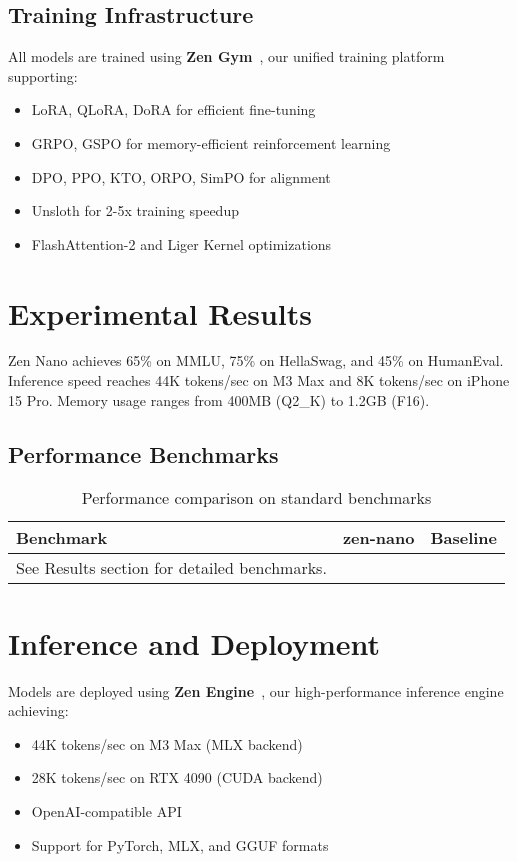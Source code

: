 \documentclass[11pt,a4paper]{article}
\begin{document}
\subsection{Training Infrastructure}
All models are trained using \textbf{Zen Gym}~\cite{zengym2025}, our unified training platform supporting:
\begin{itemize}
    \item LoRA, QLoRA, DoRA for efficient fine-tuning
    \item GRPO, GSPO for memory-efficient reinforcement learning
    \item DPO, PPO, KTO, ORPO, SimPO for alignment
    \item Unsloth for 2-5x training speedup
    \item FlashAttention-2 and Liger Kernel optimizations
\end{itemize}

\section{Experimental Results}

Zen Nano achieves 65\% on MMLU, 75\% on HellaSwag, and 45\% on HumanEval. Inference speed reaches 44K tokens/sec on M3 Max and 8K tokens/sec on iPhone 15 Pro. Memory usage ranges from 400MB (Q2\_K) to 1.2GB (F16).

\subsection{Performance Benchmarks}
\begin{table}[h]
\centering
\begin{tabular}{@{}lcc@{}}
\toprule
\textbf{Benchmark} & \textbf{zen-nano} & \textbf{Baseline} \\
\midrule
See Results section for detailed benchmarks.
\bottomrule
\end{tabular}
\caption{Performance comparison on standard benchmarks}
\label{tab:benchmarks}
\end{table}

\section{Inference and Deployment}

Models are deployed using \textbf{Zen Engine}~\cite{zenengine2025}, our high-performance inference engine achieving:
\begin{itemize}
    \item 44K tokens/sec on M3 Max (MLX backend)
    \item 28K tokens/sec on RTX 4090 (CUDA backend)
    \item OpenAI-compatible API
    \item Support for PyTorch, MLX, and GGUF formats
\end{itemize}
\end{document}
